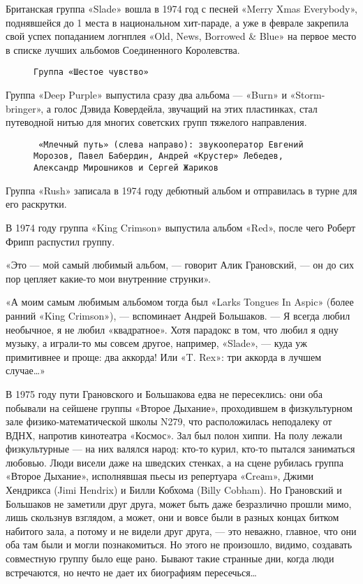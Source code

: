Британская группа «Slade» вошла в 1974 год с песней «Merry Xmas Everybody», поднявшейся до 1 места в национальном
хит-параде, а уже в феврале закрепила свой успех попаданием логнплея «Old, News, Borrowed \& Blue» на первое место в
списке лучших альбомов Соединенного Королевства.

\begin{wrapfigure}{R}{0.5\textwidth}
    \centering
    \caption{\texttt{Группа «Шестое чувство»}}
\end{wrapfigure}

Группа «Deep Purple» выпустила сразу два альбома — «Burn» и «Storm-bringer», а голос Дэвида Ковердейла, звучащий на этих
пластинках, стал путеводной нитью для многих советских групп тяжелого направления.

\begin{figure}[h]
    \centering
    \caption{\texttt{
        «Млечный путь» (слева направо): звукооператор Евгений Морозов, Павел Бабердин, Андрей «Крустер» Лебедев,
        Александр Мирошников и Сергей Жариков
    }}
\end{figure}

Группа «Rush» записала в 1974 году дебютный альбом и отправилась в турне для его раскрутки.

В 1974 году группа «King Crimson» выпустила альбом «Red», после чего Роберт Фрипп распустил группу.

«Это — мой самый любимый альбом, — говорит Алик Грановский, — он до сих пор цепляет какие-то мои внутренние струнки».

«А моим самым любимым альбомом тогда был «Larks Tongues In Aspic» (более ранний «King Crimson»), — вспоминает Андрей
Большаков. — Я всегда любил необычное, я не любил «квадратное». Хотя парадокс в том, что любил я одну музыку, а
играли-то мы совсем другое, например, «Slade», — куда уж примитивнее и проще: два аккорда! Или «T. Rex»: три аккорда в
лучшем случае\ldots»

В 1975 году пути Грановского и Большакова едва не пересеклись: они оба побывали на сейшене группы «Второе Дыхание»,
проходившем в физкультурном зале физико-математической школы N279, что расположилась неподалеку от ВДНХ, напротив
кинотеатра «Космос». Зал был полон хиппи. На полу лежали физкультурные — на них валялся народ: кто-то курил, кто-то
пытался заниматься любовью. Люди висели даже на шведских стенках, а на сцене рубилась группа «Второе Дыхание»,
исполнявшая пьесы из репертуара «Сreаm», Джими Хендрикса (Jimi Hendrix) и Билли Кобхома (Billy Cobham). Но Грановский и
Большаков не заметили друг друга, может быть даже безразлично прошли мимо, лишь скользнув взглядом, а может, они и вовсе
были в разных концах битком набитого зала, а потому и не видели друг друга, — это неважно, главное, что они оба там были
и могли познакомиться. Но этого не произошло, видимо, создавать совместную группу было еще рано. Бывают такие странные
дни, когда люди встречаются, но нечто не дает их биографиям пересечься\ldots

